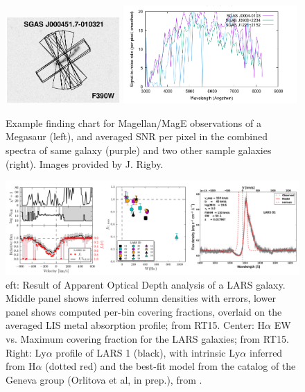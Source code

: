 \documentclass[10pt, letterpaper, headings=Large, DIV=14]{scrartcl}
\begin{document}
\begin{figure}[h] %
   \centering
   \includegraphics[width=0.39\textwidth]{MegasaurExample.png}
   \includegraphics[width=0.59\textwidth]{SNRs.png} 
   \caption{\small Example finding chart for Magellan/MagE observations of a Megasaur
	   (left), and averaged SNR per pixel in the combined spectra of same
	   galaxy (purple) and two other sample galaxies (right). Images 
	   provided by J. Rigby.}
   \label{fig:mega}
\end{figure}


\begin{figure}[h] %
   \centering
   \includegraphics[width=\textwidth]{LarsResults.png} 
   \caption{\small eft: Result of Apparent Optical Depth analysis of a LARS galaxy.
   Middle panel shows inferred column densities with errors, lower panel
   shows computed per-bin covering fractions, overlaid on the
   averaged LIS metal absorption profile; from RT15. Center: H$\alpha$ EW vs.
   Maximum covering fraction for the LARS galaxies; from RT15. Right: Ly$\alpha$
   profile of LARS 1 (black), with intrinsic Ly$\alpha$ inferred from H$\alpha$
   (dotted red) and the best-fit model from the catalog of the Geneva group
   (Orlitova et al, in prep.), from \cite{LARSI}.}
   \label{fig:LARS}
\end{figure}
\end{document}
